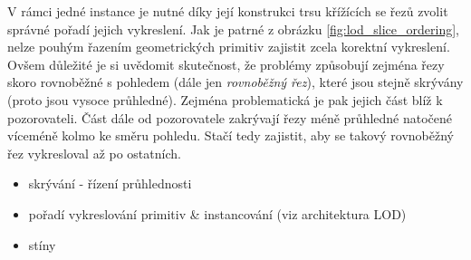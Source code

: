V rámci jedné instance je nutné díky její konstrukci trsu křížících se řezů zvolit správné pořadí jejich vykreslení. 
Jak je patrné z obrázku \ref{fig:lod_slice_ordering}, nelze pouhým řazením geometrických primitiv zajistit zcela korektní vykreslení. Ovšem důležité je si uvědomit skutečnost, že problémy způsobují zejména řezy skoro rovnoběžné s pohledem (dále jen \emph{rovnoběžný řez}), které jsou stejně skrývány (proto jsou vysoce průhledné). Zejména problematická je pak jejich část blíž k pozorovateli. Část dále od pozorovatele zakrývají řezy méně průhledné natočené víceméně kolmo ke směru pohledu. Stačí tedy zajistit, aby se takový rovnoběžný řez vykresloval až po ostatních.
%








\begin{itemize}
\item skrývání - řízení průhlednosti
\item pořadí vykreslování primitiv \& instancování (viz architektura LOD)
\item stíny
\end{itemize}